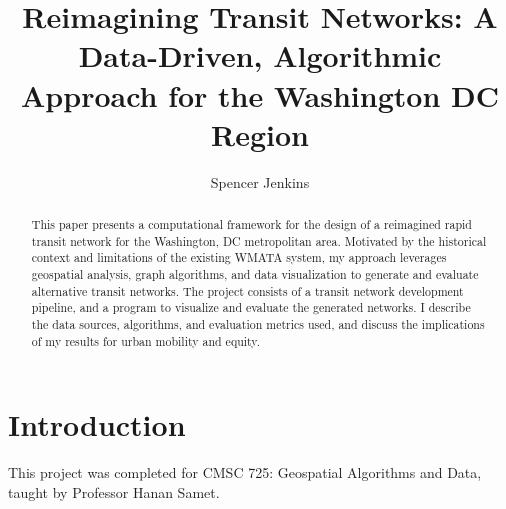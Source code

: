 \documentclass[manuscript]{acmart}
\begin{document}
\title{Reimagining Transit Networks: A Data-Driven, Algorithmic Approach for the Washington DC Region}

\author{Spencer Jenkins}


\renewcommand{\shortauthors}{Trovato et al.}

\begin{abstract}
This paper presents a computational framework for the design of a reimagined rapid transit network for the Washington, DC metropolitan area. Motivated by the historical context and limitations of the existing WMATA system, my approach leverages geospatial analysis, graph algorithms, and data visualization to generate and evaluate alternative transit networks. The project consists of a transit network development pipeline, and a program to visualize and evaluate the generated networks. I describe the data sources, algorithms, and evaluation metrics used, and discuss the implications of my results for urban mobility and equity.
\end{abstract}

\maketitle



\section{Introduction}

This project was completed for CMSC 725: Geospatial Algorithms and Data, taught by Professor Hanan Samet. 
\end{document}
